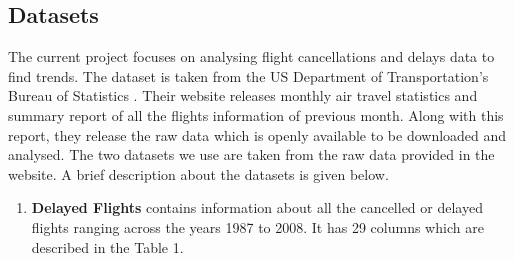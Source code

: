 \documentclass[9pt,twocolumn,twoside]{../../styles/osajnl}
\begin{document}
\subsection{Datasets}
The current project focuses on analysing flight cancellations and delays data to find trends. The dataset is taken from the US Department of Transportation's Bureau of Statistics \cite{www-rita}. Their website releases monthly air travel statistics and summary report of all the flights information of previous month. Along with this report, they release the raw data which is openly available to be downloaded and analysed. The two datasets we use are taken from the raw data provided in the website. A brief description about the datasets is given below.
\begin{enumerate}
    \item \textbf{Delayed Flights} contains information about all the cancelled or delayed flights ranging across the years 1987 to 2008. It has 29 columns which are described in the Table 1.
    

\end{enumerate}
\end{document}
